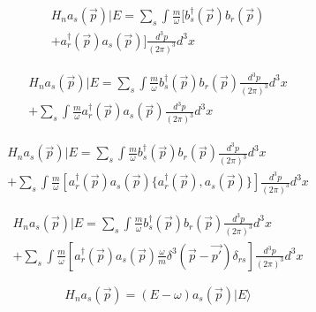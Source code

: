 \documentclass[a4]{article}
\begin{document}
    \begin{equation}
        \begin{aligned}
            H_n a_{s} (\vec{p}) | E = \sum_{s} \int \frac{m}{\omega} [b_s^{\dagger} (\vec{p}) b_r (\vec{p}) \\
        + a_r^{\dagger} (\vec{p}) a_s (\vec{p})] \frac{d^{3} p}{(2 \pi)^3} d^3 x
        \end{aligned}
    \end{equation}

    \begin{equation}
        \begin{aligned}
            H_n a_{s} (\vec{p}) | E = \sum_{s} \int \frac{m}{\omega} b_s^{\dagger} (\vec{p}) b_r (\vec{p}) \frac{d^{3} p}{(2 \pi)^3} d^3 x \\
        + \sum_{s} \int \frac{m}{\omega} a_r^{\dagger} (\vec{p}) a_s (\vec{p}) \frac{d^{3} p}{(2 \pi)^3} d^3 x
        \end{aligned}
    \end{equation}

    \begin{equation}
        \begin{aligned}
            H_n a_{s} (\vec{p}) | E = \sum_{s} \int \frac{m}{\omega} b_s^{\dagger} (\vec{p}) b_r (\vec{p}) \frac{d^{3} p}{(2 \pi)^3} d^3 x \\
        + \sum_{s} \int \frac{m}{\omega} [ a_r^{\dagger} (\vec{p}) a_s (\vec{p}) \{ a_r^{\dagger} (\vec{p}), a_s (\vec{p}) \} ] \frac{d^{3} p}{(2 \pi)^3} d^3 x
        \end{aligned}
    \end{equation}

    \begin{equation}
        \begin{aligned}
            H_n a_{s} (\vec{p}) | E = \sum_{s} \int \frac{m}{\omega} b_s^{\dagger} (\vec{p}) b_r (\vec{p}) \frac{d^{3} p}{(2 \pi)^3} d^3 x \\
        + \sum_{s} \int \frac{m}{\omega} [ a_r^{\dagger} (\vec{p}) a_s (\vec{p}) \frac{\omega}{m} \delta^3 (\vec{p} - \vec{p'}) \delta_{rs} ] \frac{d^{3} p}{(2 \pi)^3} d^3 x
        \end{aligned}
    \end{equation}

    \begin{framed}
        \begin{equation}
            H_n a_s (\vec{p}) = (E - \omega) a_s (\vec{p}) | E \rangle
        \end{equation}
    \end{framed}
\end{document}
